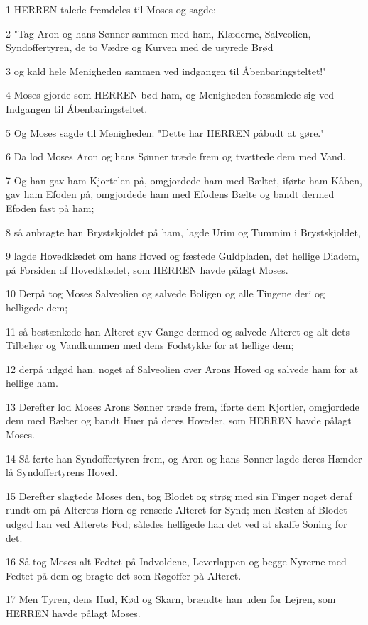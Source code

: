 \par 1 HERREN talede fremdeles til Moses og sagde:
\par 2 "Tag Aron og hans Sønner sammen med ham, Klæderne, Salveolien, Syndoffertyren, de to Vædre og Kurven med de usyrede Brød
\par 3 og kald hele Menigheden sammen ved indgangen til Åbenbaringsteltet!"
\par 4 Moses gjorde som HERREN bød ham, og Menigheden forsamlede sig ved Indgangen til Åbenbaringsteltet.
\par 5 Og Moses sagde til Menigheden: "Dette har HERREN påbudt at gøre."
\par 6 Da lod Moses Aron og hans Sønner træde frem og tvættede dem med Vand.
\par 7 Og han gav ham Kjortelen på, omgjordede ham med Bæltet, iførte ham Kåben, gav ham Efoden på, omgjordede ham med Efodens Bælte og bandt dermed Efoden fast på ham;
\par 8 så anbragte han Brystskjoldet på ham, lagde Urim og Tummim i Brystskjoldet,
\par 9 lagde Hovedklædet om hans Hoved og fæstede Guldpladen, det hellige Diadem, på Forsiden af Hovedklædet, som HERREN havde pålagt Moses.
\par 10 Derpå tog Moses Salveolien og salvede Boligen og alle Tingene deri og helligede dem;
\par 11 så bestænkede han Alteret syv Gange dermed og salvede Alteret og alt dets Tilbehør og Vandkummen med dens Fodstykke for at hellige dem;
\par 12 derpå udgød han. noget af Salveolien over Arons Hoved og salvede ham for at hellige ham.
\par 13 Derefter lod Moses Arons Sønner træde frem, iførte dem Kjortler, omgjordede dem med Bælter og bandt Huer på deres Hoveder, som HERREN havde pålagt Moses.
\par 14 Så førte han Syndoffertyren frem, og Aron og hans Sønner lagde deres Hænder lå Syndoffertyrens Hoved.
\par 15 Derefter slagtede Moses den, tog Blodet og strøg med sin Finger noget deraf rundt om på Alterets Horn og rensede Alteret for Synd; men Resten af Blodet udgød han ved Alterets Fod; således helligede han det ved at skaffe Soning for det.
\par 16 Så tog Moses alt Fedtet på Indvoldene, Leverlappen og begge Nyrerne med Fedtet på dem og bragte det som Røgoffer på Alteret.
\par 17 Men Tyren, dens Hud, Kød og Skarn, brændte han uden for Lejren, som HERREN havde pålagt Moses.
